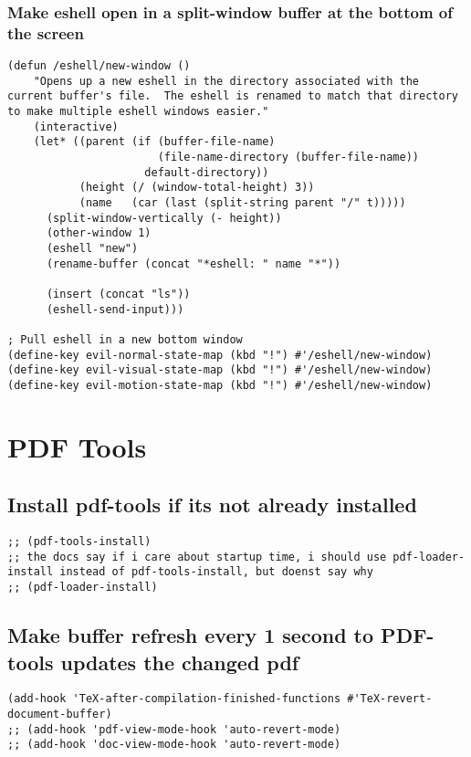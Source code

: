 \documentclass[11pt]{article}
\begin{document}
\subsubsection*{Make eshell open in a split-window buffer at the bottom of the screen}
\label{sec:org676b10d}

\begin{verbatim}
(defun /eshell/new-window ()
    "Opens up a new eshell in the directory associated with the current buffer's file.  The eshell is renamed to match that directory to make multiple eshell windows easier."
    (interactive)
    (let* ((parent (if (buffer-file-name)
                       (file-name-directory (buffer-file-name))
                     default-directory))
           (height (/ (window-total-height) 3))
           (name   (car (last (split-string parent "/" t)))))
      (split-window-vertically (- height))
      (other-window 1)
      (eshell "new")
      (rename-buffer (concat "*eshell: " name "*"))

      (insert (concat "ls"))
      (eshell-send-input)))

; Pull eshell in a new bottom window
(define-key evil-normal-state-map (kbd "!") #'/eshell/new-window)
(define-key evil-visual-state-map (kbd "!") #'/eshell/new-window)
(define-key evil-motion-state-map (kbd "!") #'/eshell/new-window)
\end{verbatim}




\section*{PDF Tools}
\label{sec:org9ffc18b}

\subsection*{Install pdf-tools if its not already installed}
\label{sec:org86a9212}
\begin{verbatim}
;; (pdf-tools-install)
;; the docs say if i care about startup time, i should use pdf-loader-install instead of pdf-tools-install, but doenst say why
;; (pdf-loader-install) 
\end{verbatim}

\subsection*{Make buffer refresh every 1 second to PDF-tools updates the changed pdf}
\label{sec:orgf95922d}
\begin{verbatim}
(add-hook 'TeX-after-compilation-finished-functions #'TeX-revert-document-buffer)
;; (add-hook 'pdf-view-mode-hook 'auto-revert-mode) 
;; (add-hook 'doc-view-mode-hook 'auto-revert-mode) 
\end{verbatim}
\end{document}

